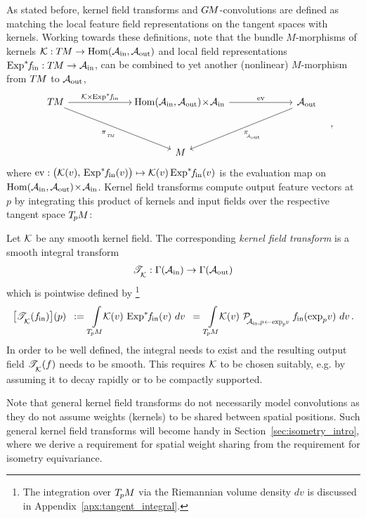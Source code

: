 As stated before, kernel field transforms and $G\mkern-1.4muM$-convolutions are defined as matching the local feature field representations on the tangent spaces with kernels.
Working towards these definitions, note that the bundle $M$-morphisms of kernels $\mathcal{K}: T\mkern-1.5muM \to \operatorname{Hom}(\mathcal{A}_\textup{in},\mathcal{A}_\textup{out})$ and local field representations $\operatorname{Exp}^*\mkern-5mu f_\textup{\;\!\!in}: T\mkern-1.5muM \to \mathcal{A}_\textup{in}$, can be combined to yet another (nonlinear) $M$-morphism from $T\mkern-1.5muM$ to $\mathcal{A}_\textup{out}$,
\begin{equation}\label{eq:integrand_bundle_map}
    \quad
    \begin{tikzcd}[row sep=3.5em, column sep=6.5em]
        \TM  \arrow[rd, start anchor={[xshift=-1ex]}, "\piTM"']
            \arrow[r, "\K \mkern-1mu\times\mkern-1mu \Expsfin"]
        &
        \mkern-3mu
        \Hom(\Ain,\Aout) \!\times\! \Ain
            \arrow[r, "\ev"]
        &
        \Aout
            \arrow[ld, "\piAout"] \\
        & M &
    \end{tikzcd}
    \quad,
\end{equation}
where $\operatorname{ev}: \big(\mathcal{K}(v),\, \operatorname{Exp}^*\mkern-5mu f_\textup{\;\!\!in}(v)\big) \mapsto \mathcal{K}(v) \operatorname{Exp}^*\mkern-5mu f_\textup{\;\!\!in}(v)$ is the evaluation map on $\operatorname{Hom}(\mathcal{A}_\textup{in},\mathcal{A}_\textup{out}) \!\times\! \mathcal{A}_\textup{in}$.
Kernel field transforms compute output feature vectors at~$p$ by integrating this product of kernels and input fields over the respective tangent space $T_{\mkern-1.5mu p}\mkern-.5muM$:
\begin{dfn}
\label{dfn:kernel_field_trafo}
    Let $\mathcal{K}$ be any smooth kernel field.
    The corresponding \emph{kernel field transform} is a smooth integral transform
    \begin{align}\label{eq:kernel_field_trafo_def_signature}
        \mathscr{T}_{\overset{}{\mkern-0mu \mathcal{K}}}: \Gamma(\mathcal{A}_\textup{in})\to \Gamma(\mathcal{A}_\textup{out})
    \end{align}
    which is pointwise defined by%
    \footnote{
        The integration over $T_{\mkern-1.5mu p}\mkern-.5muM$ via the Riemannian volume density $dv$ is discussed in Appendix~\ref{apx:tangent_integral}.
    }
    \begin{align}\label{eq:kernel_field_trafo_def_ptwise}
        \big[ \TK (\fin)\big] (p)
        \,\ :=\, \int\limits_{\TpM}\!\!
            \K(v) \,
            \Expsfin (v)
            \ dv
        \,\ =\, \int\limits_{\TpM}\!\!
            \K(v) \ 
            \PAinexppv \; \fin(\exp_p\!v)
            \ dv \,.
    \end{align}
    In order to be well defined, the integral needs to exist and the resulting output field $\mathscr{T}_{\overset{}{\mkern-0mu \mathcal{K}}}(f)$ needs to be smooth.
    This requires $\mathcal{K}$ to be chosen suitably, e.g. by assuming it to decay rapidly or to be compactly supported.
\end{dfn}
Note that general kernel field transforms do not necessarily model convolutions as they do not assume weights (kernels) to be shared between spatial positions.
Such general kernel field transforms will become handy in Section~\ref{sec:isometry_intro}, where we derive a requirement for spatial weight sharing from the requirement for isometry equivariance.


